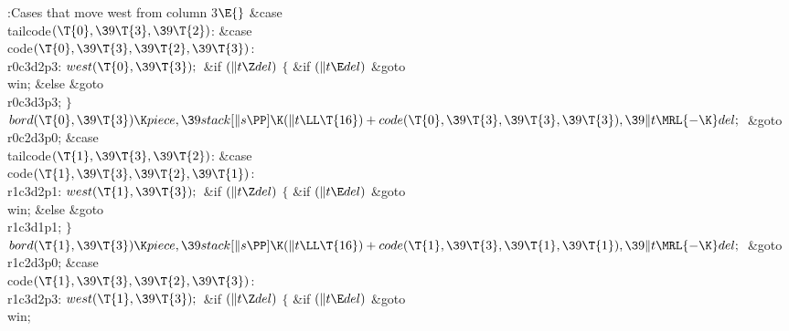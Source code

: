 \B{}:Cases that move west from column 3\X${}\E{}$%
\6
\4\&{case} \\{tailcode}${}(\T{0},\39\T{3},\39\T{2}){}$:\5
\&{case} \\{code}${}(\T{0},\39\T{3},\39\T{2},\39\T{3}){}$:\5
\\{r0c3d2p3}:\5
${}\\{west}(\T{0},\39\T{3});{}$\6
\&{if} ${}(\|t\Z\\{del}){}$\5
${}\{{}$\5
\1\&{if} ${}(\|t\E\\{del}){}$\1\5
\&{goto} \\{win};\5
\2\&{else}\1\5
\&{goto} \\{r0c3d3p3};\5
\2${}\}{}$\2\6
${}\\{bord}(\T{0},\39\T{3})\K\\{piece},\39\\{stack}[\|s\PP]\K(\|t\LL\T{16})+%
\\{code}(\T{0},\39\T{3},\39\T{3},\39\T{3}),\39\|t\MRL{-{\K}}\\{del};{}$\6
\&{goto} \\{r0c2d3p0};\6
\4\&{case} \\{tailcode}${}(\T{1},\39\T{3},\39\T{2}){}$:\5
\&{case} \\{code}${}(\T{1},\39\T{3},\39\T{2},\39\T{1}){}$:\5
\\{r1c3d2p1}:\5
${}\\{west}(\T{1},\39\T{3});{}$\6
\&{if} ${}(\|t\Z\\{del}){}$\5
${}\{{}$\5
\1\&{if} ${}(\|t\E\\{del}){}$\1\5
\&{goto} \\{win};\5
\2\&{else}\1\5
\&{goto} \\{r1c3d1p1};\5
\2${}\}{}$\2\6
${}\\{bord}(\T{1},\39\T{3})\K\\{piece},\39\\{stack}[\|s\PP]\K(\|t\LL\T{16})+%
\\{code}(\T{1},\39\T{3},\39\T{1},\39\T{1}),\39\|t\MRL{-{\K}}\\{del};{}$\6
\&{goto} \\{r1c2d3p0};\6
\4\&{case} \\{code}${}(\T{1},\39\T{3},\39\T{2},\39\T{3}){}$:\5
\\{r1c3d2p3}:\5
${}\\{west}(\T{1},\39\T{3});{}$\6
\&{if} ${}(\|t\Z\\{del}){}$\5
${}\{{}$\5
\1\&{if} ${}(\|t\E\\{del}){}$\1\5
\&{goto} \\{win};\5
